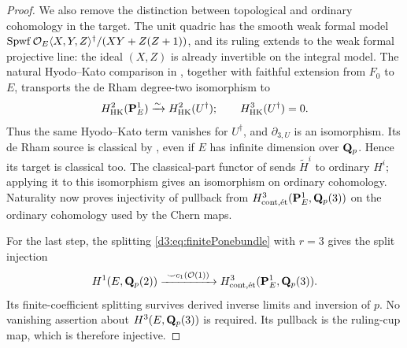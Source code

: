 \begin{proof}
We also remove the distinction between topological and ordinary
cohomology in the target. The unit quadric has the smooth weak formal
model
$\operatorname{Spwf}\mathcal O_E\langle X,Y,Z\rangle^\dagger/
(XY+Z(Z+1))$, and its ruling extends to the weak formal projective
line: the ideal $(X,Z)$ is already invertible on the integral model.
The natural Hyodo--Kato comparison in
\cite[equation~(5.4) and the following strict quasi-isomorphism,
Propositions~5.5--5.6]{ColmezNiziol}, together with faithful extension
from $F_0$ to $E$, transports the de Rham degree-two isomorphism to
\[
 H^2_{\mathrm{HK}}(\mathbf P^1_E)
       \xrightarrow{\sim}H^2_{\mathrm{HK}}(U^\dagger);
 \qquad H^3_{\mathrm{HK}}(U^\dagger)=0.
\]
Thus the same Hyodo--Kato term vanishes for $U^\dagger$, and
$\partial_{3,U}$ is an isomorphism.
Its de Rham source is classical by
\cite[Section~5.1]{ColmezNiziol}, even if $E$ has infinite dimension
over $\mathbf Q_p$. Hence its target is classical too.
The classical-part functor of \cite[Section~3.1.1]{ColmezNiziol}
sends $\widetilde H^i$ to ordinary $H^i$; applying it to this
isomorphism gives an isomorphism on ordinary cohomology.
Naturality now proves injectivity of pullback from
$H^3_{\mathrm{cont},\mathrm{\acute et}}(\mathbf P^1_E,\mathbf Q_p(3))$ on the
ordinary cohomology used by the Chern maps.

For the last step, the splitting \eqref{d3:eq:finitePonebundle}
with $r=3$ gives the split injection
\[
 H^1(E,\mathbf Q_p(2))
 \xrightarrow{\ \smile c_1(\mathcal O(1))\ }
 H^3_{\mathrm{cont},\mathrm{\acute et}}(\mathbf P^1_E,\mathbf Q_p(3)).
\]
Its finite-coefficient splitting survives derived inverse limits and
inversion of $p$. No vanishing assertion about
$H^3(E,\mathbf Q_p(3))$ is required.
Its pullback is the ruling-cup map, which is therefore
injective.
\end{proof}

